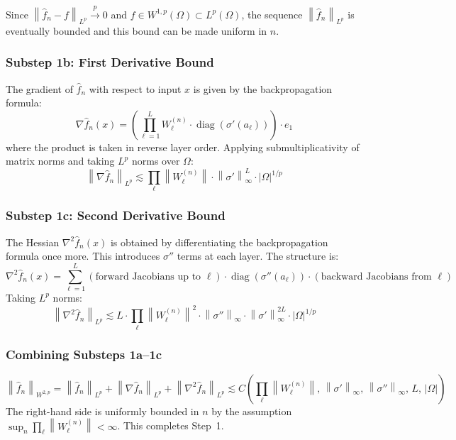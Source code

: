 \documentclass[12pt]{article}
\newcommand{\norm}[1]{\left\| #1 \right\|}
\newcommand{\Lp}{L^p(\Omega)}
\newcommand{\Wonep}{W^{1,p}(\Omega)}
\newcommand{\fn}{\hat{f}_n}
\newcommand{\xrightarrowp}{\xrightarrow{p}}
\begin{document}
	Since $\norm{\fn - f}_{L^p} \xrightarrowp 0$ and $f \in \Wonep \subset \Lp$,
	the sequence $\norm{\fn}_{L^p}$ is eventually bounded and this bound can be
	made uniform in $n$.
	
	\subsubsection*{Substep 1b: First Derivative Bound}
	
	The gradient of $\fn$ with respect to input $x$ is given by the
	backpropagation formula:
	\begin{equation}
		\nabla \fn(x) =
		\left(\prod_{\ell=1}^{L} W_\ell^{(n)} \cdot
		\operatorname{diag}(\sigma'(a_\ell))\right) \cdot e_1
	\end{equation}
	where the product is taken in reverse layer order. Applying submultiplicativity
	of matrix norms and taking $L^p$ norms over $\Omega$:
	\begin{equation}
		\norm{\nabla \fn}_{L^p}
		\lesssim \prod_\ell \norm{W_\ell^{(n)}} \cdot
		\norm{\sigma'}_\infty^L \cdot |\Omega|^{1/p}
	\end{equation}
	
	\subsubsection*{Substep 1c: Second Derivative Bound}
	
	The Hessian $\nabla^2 \fn(x)$ is obtained by differentiating the
	backpropagation formula once more. This introduces $\sigma''$ terms at each
	layer. The structure is:
	\begin{equation}
		\nabla^2 \fn(x) = \sum_{\ell=1}^L
		\left(\text{forward Jacobians up to } \ell\right)
		\cdot \operatorname{diag}(\sigma''(a_\ell)) \cdot
		\left(\text{backward Jacobians from } \ell\right)
	\end{equation}
	Taking $L^p$ norms:
	\begin{equation}
		\norm{\nabla^2 \fn}_{L^p}
		\lesssim L \cdot \prod_\ell \norm{W_\ell^{(n)}}^2 \cdot
		\norm{\sigma''}_\infty \cdot \norm{\sigma'}_\infty^{2L} \cdot
		|\Omega|^{1/p}
	\end{equation}
	
	\subsubsection*{Combining Substeps 1a--1c}
	
	\begin{equation}
		\norm{\fn}_{W^{2,p}}
		= \norm{\fn}_{L^p} + \norm{\nabla \fn}_{L^p} + \norm{\nabla^2 \fn}_{L^p}
		\lesssim C\!\left(\prod_\ell \norm{W_\ell^{(n)}},\,
		\norm{\sigma'}_\infty,\, \norm{\sigma''}_\infty,\, L,\, |\Omega|\right)
	\end{equation}
	The right-hand side is uniformly bounded in $n$ by the assumption
	$\sup_n \prod_\ell \norm{W_\ell^{(n)}} < \infty$. This completes Step~1.
	
\end{document}
